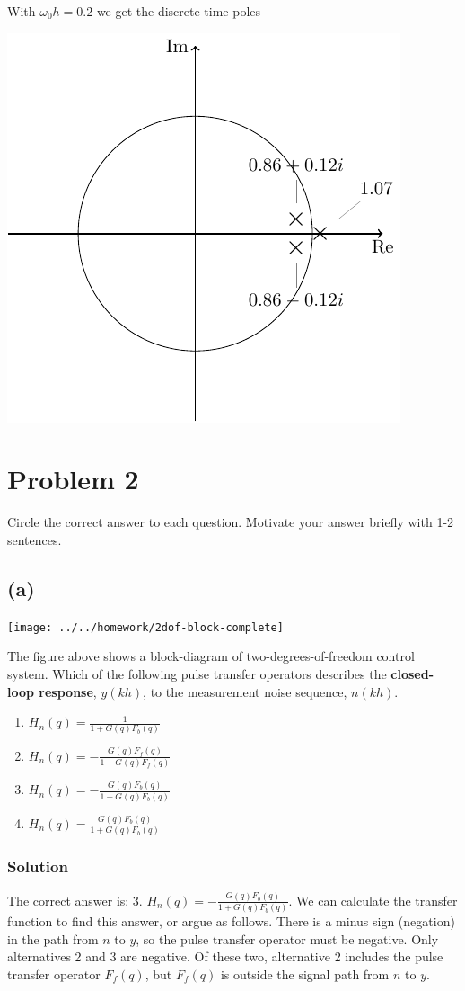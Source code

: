 \documentclass[a4paper]{scrartcl}
\begin{document}
With $\omega_0h=0.2$ we get the discrete time poles
\begin{center}
\includegraphics[width=0.3\linewidth]{imaginary-plane-dt-poles}
\end{center}

\section*{Problem 2}
\label{sec-2}
Circle the correct answer to each question. Motivate your answer briefly with 1-2 sentences.

\subsection*{(a)}
\label{sec-2-1}
\begin{center}
\texttt{[image: ../../homework/2dof-block-complete]}
\end{center}
The figure above shows a block-diagram of two-degrees-of-freedom control system. Which of the following pulse transfer operators describes the \textbf{closed-loop response}, $y(kh)$, to the measurement noise sequence, $n(kh)$.    
\begin{enumerate}
\item \( H_n(q) = \frac{1}{1 + G(q)F_b(q)} \)
\item \( H_n(q) = -\frac{G(q)F_f(q)}{1 + G(q)F_f(q)} \)
\item \( H_n(q) = -\frac{G(q)F_b(q)}{1 + G(q)F_b(q)} \)
\item \( H_n(q) = \frac{G(q)F_b(q)}{1 + G(q)F_b(q)} \)
\end{enumerate}

\subsubsection*{Solution}
\label{sec-2-1-1}
The correct answer is: 3. \( H_n(q) = -\frac{G(q)F_b(q)}{1 + G(q)F_b(q)} \). We can calculate the transfer function to find this answer, or argue as follows. There is a minus sign (negation) in the path from $n$ to $y$, so the pulse transfer operator must be negative. Only alternatives 2 and 3 are negative. Of these two, alternative 2 includes the pulse transfer operator $F_f(q)$, but $F_f(q)$ is outside the signal path from $n$ to $y$.
\end{document}
